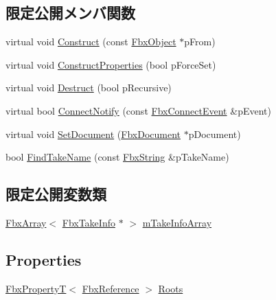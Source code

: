 \subsection*{限定公開メンバ関数}
\begin{DoxyCompactItemize}
\item 
virtual void \hyperlink{class_fbx_document_a9bc37787619a99fca90b839c16e4f2b8}{Construct} (const \hyperlink{class_fbx_object}{Fbx\+Object} $\ast$p\+From)
\item 
virtual void \hyperlink{class_fbx_document_a10a4a36c6d252d72036abc1f9d02aeee}{Construct\+Properties} (bool p\+Force\+Set)
\item 
virtual void \hyperlink{class_fbx_document_a172d19ae540cbd086ade62adaf1a54b8}{Destruct} (bool p\+Recursive)
\item 
virtual bool \hyperlink{class_fbx_document_a7c3b910b2d44729973266e32733da3fb}{Connect\+Notify} (const \hyperlink{class_fbx_connect_event}{Fbx\+Connect\+Event} \&p\+Event)
\item 
virtual void \hyperlink{class_fbx_document_a063190c324b6fb999b4ac2a1169c2aab}{Set\+Document} (\hyperlink{class_fbx_document}{Fbx\+Document} $\ast$p\+Document)
\item 
bool \hyperlink{class_fbx_document_aefcce26df173f0391b6540c003c52ea9}{Find\+Take\+Name} (const \hyperlink{class_fbx_string}{Fbx\+String} \&p\+Take\+Name)
\end{DoxyCompactItemize}
\subsection*{限定公開変数類}
\begin{DoxyCompactItemize}
\item 
\hyperlink{class_fbx_array}{Fbx\+Array}$<$ \hyperlink{class_fbx_take_info}{Fbx\+Take\+Info} $\ast$ $>$ \hyperlink{class_fbx_document_a810679765dee13dd45040367eb59b131}{m\+Take\+Info\+Array}
\end{DoxyCompactItemize}
\subsection*{Properties}
\begin{DoxyCompactItemize}
\item 
\hyperlink{class_fbx_property_t}{Fbx\+PropertyT}$<$ \hyperlink{fbxtypes_8h_a44df6a2eec915cf27cd481e5c5e48a24}{Fbx\+Reference} $>$ \hyperlink{class_fbx_document_a268f701bbd245e43e661bc9a69f87646}{Roots}
\end{DoxyCompactItemize}
